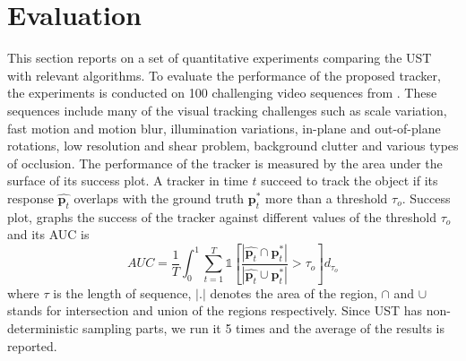 \documentclass[conference,twoside]{IEEEtran}
\begin{document}
\section{Evaluation}
\label{sect:eval}
This section reports on a set of quantitative experiments comparing the UST with relevant algorithms. %
%
To evaluate the performance of the proposed tracker, the experiments is conducted on 100 challenging video sequences from \cite{wu2015object}. These sequences include many of the visual tracking challenges such as scale variation, fast motion and motion blur, illumination variations, in-plane and out-of-plane rotations, low resolution and shear problem, background clutter and various types of occlusion. The performance of the tracker is measured by the area under the surface of its success plot. A tracker in time $t$ succeed to track the object if its response $\hat{\mathbf{p}_t}$ overlaps with the ground truth $\mathbf{p}_t^*$ more than a threshold $\tau_o$. Success plot, graphs the success of the tracker against different values of the threshold $\tau_o$ and its AUC is
\begin{equation}
AUC = \frac{1}{T} \int_0^1 \sum_{t=1}^T \mathds{1} \left[ \frac{ | \hat{\mathbf{p}_t} \cap {\mathbf{p}_t^*} | }{ | \hat{\mathbf{p}_t} \cup {\mathbf{p}_t^*} | } > \tau_o \right] d_{\tau_o}
\end{equation}
where $\tau$ is the length of sequence, $|.|$ denotes the area of the region, $\cap$ and $\cup$ stands for intersection and union of the regions respectively. Since UST has non-deterministic sampling parts, we run it 5 times and the average of the results is reported.
\end{document}
